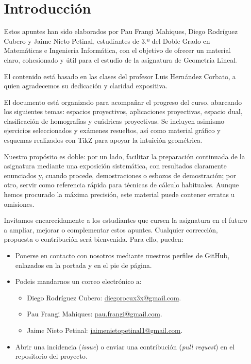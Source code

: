 \section*{Introducción}

Estos apuntes han sido elaborados por Pau Frangi Mahiques, Diego Rodríguez Cubero y Jaime Nieto Petinal, estudiantes de 3.º del Doble Grado en Matemáticas e Ingeniería Informática, con el objetivo de ofrecer un material claro, cohesionado y útil para el estudio de la asignatura de Geometría Lineal.

El contenido está basado en las clases del profesor Luis Hernández Corbato, a quien agradecemos su dedicación y claridad expositiva.

El documento está organizado para acompañar el progreso del curso, abarcando los siguientes temas: espacios proyectivos, aplicaciones proyectivas, espacio dual, clasificación de homografías y cuádricas proyectivas. Se incluyen asimismo ejercicios seleccionados y exámenes resueltos, así como material gráfico y esquemas realizados con TikZ para apoyar la intuición geométrica.

Nuestro propósito es doble: por un lado, facilitar la preparación continuada de la asignatura mediante una exposición sistemática, con resultados claramente enunciados y, cuando procede, demostraciones o esbozos de demostración; por otro, servir como referencia rápida para técnicas de cálculo habituales. Aunque hemos procurado la máxima precisión, este material puede contener erratas u omisiones.

Invitamos encarecidamente a los estudiantes que cursen la asignatura en el futuro a ampliar, mejorar o complementar estos apuntes. Cualquier corrección, propuesta o contribución será bienvenida. Para ello, pueden:
\begin{itemize}
	\item Ponerse en contacto con nosotros mediante nuestros perfiles de GitHub, enlazados en la portada y en el pie de página.
	\item Podeis mandarnos un correo electrónico a:
	\begin{itemize}
        \item Diego Rodríguez Cubero: \href{mailto:diegorocux3x@gmail.com}{diegorocux3x@gmail.com}.
        \item Pau Frangi Mahiques: \href{mailto:pau.frangi@gmail.com}{pau.frangi@gmail.com}.
        \item Jaime Nieto Petinal: \href{mailto:jaimenietopetinal1@gmail.com}{jaimenietopetinal1@gmail.com}.
    \end{itemize}
    \item Abrir una incidencia (\emph{issue}) o enviar una contribución (\emph{pull request}) en el repositorio del proyecto.
\end{itemize}

